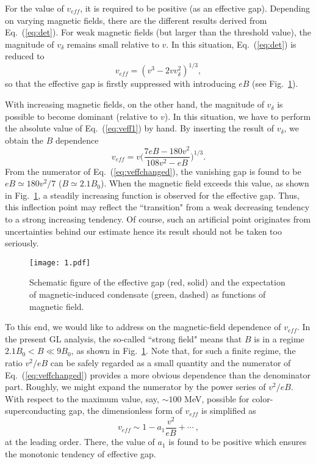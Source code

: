 \documentclass[prd, showpacs,nofootinbib,amsmath,amssymb]{revtex4}
\begin{document}
For the value of $v_{eff}$, it is required to be positive (as an effective gap).
Depending on varying magnetic fields, there are the different results derived from Eq.~(\ref{eq:det}).
For weak magnetic fields (but larger than the threshold value), the magnitude of $v_\delta$ remains
small relative to $v$. In this situation, Eq.~(\ref{eq:det}) is reduced to
\begin{equation}
\label{eq:veff1}
v_{eff} =  (v^3-2 vv_\delta^2)^{1/3},
\end{equation}
so that the effective gap is firstly suppressed with introducing $eB$ (see Fig.~\ref{fig:1}).

With increasing magnetic fields, on the other hand, the magnitude of $v_\delta$ is possible to
become dominant (relative to $v$). In this situation, we have to perform the absolute value of
Eq.~(\ref{eq:veff1}) by hand. By inserting the result of $v_\delta$, we obtain the $B$ dependence
\begin{equation}
\label{eq:veffchanged}
v_{eff} = v \Big(\frac{7eB-180v^2}{108v^2-eB}\Big)^{1/3}.
\end{equation}
From the numerator of Eq.~(\ref{eq:veffchanged}), the vanishing gap is found to be $eB\simeq 180v^2/7$
($B \simeq 2.1 B_0$).
When the magnetic field exceeds this value, as shown in Fig.~\ref{fig:1}, a steadily increasing function
is observed for the effective gap. Thus, this inflection point may reflect the ``transition" from a weak
decreasing tendency to a strong increasing tendency. Of course, such an artificial point originates from
uncertainties behind our estimate hence its result should not be taken too seriously.

\begin{figure}[ht]
\centering
\texttt{[image: 1.pdf]}

\caption{Schematic figure of the effective gap (red, solid) and the expectation of magnetic-induced condensate (green, dashed) as functions of magnetic field.}
	\label{fig:1}
\end{figure}

To this end, we would like to address on the magnetic-field dependence of $v_{eff}$. In the
present GL analysis, the so-called ``strong field" means that $B$ is in a regime
$2.1 B_0 < B \ll 9 B_0$, as shown in Fig.~\ref{fig:1}. Note that, for such a finite regime,
the ratio $v^2/eB$ can be safely regarded as a small quantity and the numerator of
Eq.~(\ref{eq:veffchanged}) provides a more obvious dependence than the denominator part.
Roughly, we might expand the numerator by the power series of $v^2/eB$. With respect to the
maximum value, say, $\sim 100$ MeV, possible for color-superconducting gap, the dimensionless
form of $v_{eff}$ is simplified as
\begin{equation}\label{eq:expansion1}
 v_{eff} \sim 1 - a_1 \frac{v^2}{eB} + \cdots \ ,
\end{equation}
at the leading order. There, the value of $a_1$ is found to be positive which ensures the
monotonic tendency of effective gap.
\end{document}
